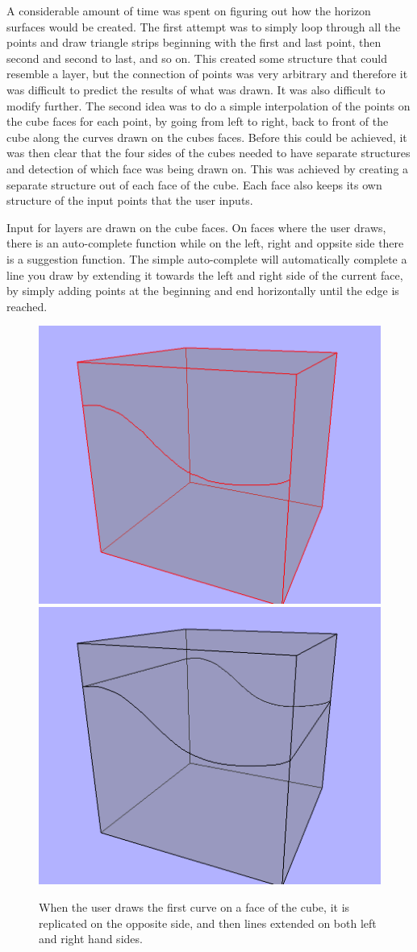 \documentclass[a4paper,12pt]{report}
\begin{document}
A considerable amount of time was spent on figuring out how the horizon surfaces would be created. The first attempt was to simply loop through all the points and draw triangle strips beginning with the first and last point, then second and second to last, and so on. This created some structure that could resemble a layer, but the connection of points was very arbitrary and therefore it was difficult to predict the results of what was drawn. It was also difficult to modify further. The second idea was to do a simple interpolation of the points on the cube faces for each point, by going from left to right, back to front of the cube along the curves drawn on the cubes faces. Before this could be achieved, it was then clear that the four sides of the cubes needed to have separate structures and detection of which face was being drawn on. This was achieved by creating a separate structure out of each 
face of the cube. Each face also keeps its own structure of the input points that the user inputs.


Input for layers are drawn on the cube faces. On faces where the user draws, there is an auto-complete function while on the left, right and oppsite side there is a suggestion function. The simple auto-complete will automatically complete a line you draw by extending it towards the left and right side of the current face, by simply adding points at the beginning and end horizontally until the edge is reached.

\begin{figure}
\includegraphics[width=.5\linewidth]{thesis/suggestion1.png}
\includegraphics[width=.5\linewidth]{thesis/suggestion2.png}
 \caption{When the user draws the first curve on a face of the cube, it is replicated on the opposite side, and then lines extended on both left and right hand sides.}
 \label{fig:suggest}
\end{figure}
\end{document}
